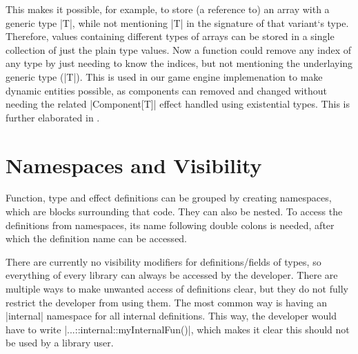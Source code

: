 This makes it possible, for example, to store (a reference to) an array with a generic type |T|, while not mentioning |T| in the signature of that variant`s type. Therefore, values containing different types of arrays can be stored in a single collection of just the plain type values. Now a function could remove any index of any type by just needing to know the indices, but not mentioning the underlaying generic type (|T|). This is used in our game engine implemenation to make dynamic entities possible, as components can removed and changed without needing the related |Component[T]| effect handled using existential types. This is further elaborated in .

\section{Namespaces and Visibility}

Function, type and effect definitions can be grouped by creating namespaces, which are blocks surrounding that code. They can also be nested. To access the definitions from namespaces, its name following double colons is needed, after which the definition name can be accessed.

There are currently no visibility modifiers for definitions/fields of types, so everything of every library can always be accessed by the developer. There are multiple ways to make unwanted access of definitions clear, but they do not fully restrict the developer from using them. The most common way is having an |internal| namespace for all internal definitions. This way, the developer would have to write |...::internal::myInternalFun()|, which makes it clear this should not be used by a library user.
